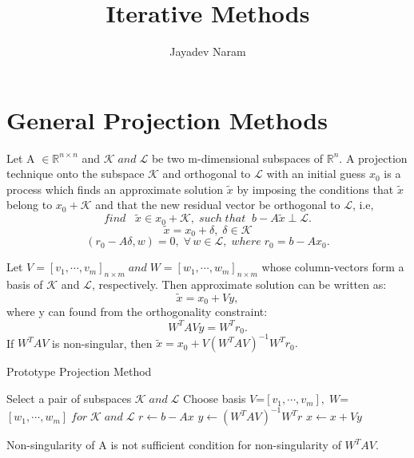 \documentclass[10pt,a4paper]{article}
\author{Jayadev Naram}
\title{Iterative Methods}
\begin{document}
\maketitle 

  
\newtheorem{theorem}{Theorem}
\newtheorem{corollary}{Corollary}[theorem]
\newtheorem{lemma}[theorem]{Lemma}
\newtheorem{mydef}{Definition}
\newtheorem*{remark}{Remark}
\newtheorem*{prop}{Proposition}

\section{General Projection Methods}

Let A $\in\mathbb{R}^{n\times n}$ and $\mathcal{K}\;and\;\mathcal{L}$ be two m-dimensional subspaces of $\mathbb{R}^n$. A projection technique onto the subspace $\mathcal{K}$ and orthogonal to $\mathcal{L}$ with an initial guess $x_0$ is a process which finds an approximate solution $\tilde{x}$ by imposing the conditions that $\tilde{x}$ belong to $x_0+\mathcal{K}$ and that the new residual vector be orthogonal to $\mathcal{L}$, i.e, $$find\;\;\;\tilde{x}\in x_0+\mathcal{K},\;such\;that\;\;b-A\tilde{x}\perp \mathcal{L}.$$
$$\tilde{x}=x_0+\delta,\;\delta\in\mathcal{K}$$
$$(r_0-A\delta,w)=0,\;\forall\,w\in\mathcal{L},\;where\;r_0=b-Ax_0.$$

Let $V=[v_1,\cdots,v_m]_{n\times m}\;and\;W=[w_1,\cdots,w_m]_{n\times m}$ whose column-vectors form a basis of $\mathcal{K}$ and $\mathcal{L}$, respectively.
Then approximate solution can be written as:
$$\tilde{x}=x_0+Vy,$$
where y can found from the orthogonality constraint:
$$W^TAVy=W^Tr_0.$$
If $W^TAV$ is non-singular, then $\tilde{x}=x_0+V(W^TAV)^{-1}W^Tr_0.$

\begin{algorithm}
\caption{Prototype Projection Method}
\begin{algorithmic}[1]
\Repeat
	\State Select a pair of subspaces $\mathcal{K}\;and\;\mathcal{L}$
	\State Choose basis $V$=$[v_1,\cdots,v_m],\;W$=$[w_1,\cdots,w_m]\;for\;\mathcal{K}\;and\;\mathcal{L}$
	\State $r\gets b-Ax$
	\State $y\gets (W^TAV)^{-1}W^Tr$
	\State $x\gets x+Vy$
\end{algorithmic}
\end{algorithm}

Non-singularity of A is not sufficient condition for non-singularity of $W^TAV$.
\end{document}
